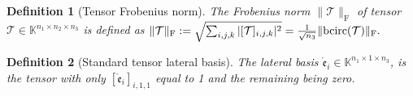 \documentclass[twoside,12pt]{article}
\newtheorem{definition}{Definition}
\def\fro{{\mathrm{F}}}
\def\fro{{\mathrm{F}}}
\begin{document}
\begin{definition}[Tensor Frobenius norm]
The   Frobenius norm $\|\mathcal{T}\|_{\fro}$ of   tensor $\mathcal{T}\in\mathbb{K}^{n_1\times n_2\times n_3}$ is defined as
$
\|\mathcal{T}\|_{\fro} := \sqrt{\sum_{i,j,k}|[\mathcal{T}]_{i,j,k}|^2}=
\frac{1}{\sqrt{n_{3}}} \|\textnormal{bcirc}(\mathcal{T})\|_{\fro}.$
\end{definition}




\begin{definition}[Standard tensor lateral basis] \rm
The lateral basis $\mathring{\mathfrak{e}}_{i}\in\mathbb{K}^{n_1 \times 1 \times n_3}$, is the tensor with only $[\mathring{\mathfrak{e}}_{i}]_{i,1,1}$ equal to 1 and the remaining being zero. %
\end{definition}
\end{document}
